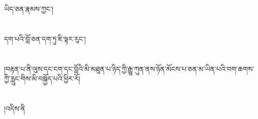 ཡིད་ཅན་རྣམས་ཀྱང་།\chapter{ }དག་པའི་བློ་ཅན་དག་ཏུ་ཇི་ལྟར་རུང་།\chapter{ }།བརྟན་པ་ནི་ལུས་དང་ངག་དང་བློའི་མི་མཐུན་པ་ཉིད་ཀྱི་རྒྱུ་ཀུན་ནས་ཉོན་མོངས་པ་ཅན་མ་ཡིན་པའི་བག་ཆགས་ཀྱི་རླུང་གིས་མི་བསྐྱོད་པའི་ཕྱིར་རོ།\chapter{ }།འདིས་ནི